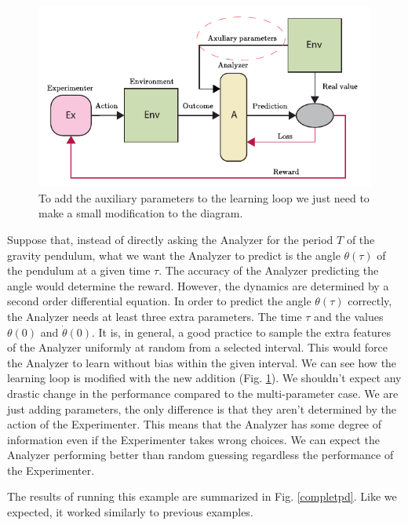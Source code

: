 \documentclass[11pt,a4paper,twoside]{report}
\newcommand{\+}{\textnormal{+} }
\theoremstyle{definition}
\numberwithin{equation}{chapter}
\begin{document}
  \begin{figure}
    \centering
    \includegraphics{figures/Auxiliary Parameters.pdf}
    \caption{To add the auxiliary parameters to the learning loop we just need
    to make a small modification to the diagram.}
    \label{fig:auxiliaryparameter}
  \end{figure}

  Suppose that, instead of directly asking the Analyzer for the period $T$ of
  the gravity pendulum, what we want the Analyzer to predict is the angle
  $\theta(\tau)$ of the pendulum at a given time $\tau$. The accuracy of the
  Analyzer predicting the angle would determine the reward. However, the
  dynamics are determined by a second order differential equation. In order to
  predict the angle $\theta(\tau)$ correctly, the Analyzer needs at least three
  extra parameters. The time $\tau$ and the values $\theta(0)$ and
  $\dot{\theta}(0)$. It is, in general, a good practice to sample the extra
  features of the Analyzer uniformly at random from a selected interval. This
  would force the Analyzer to learn without bias within the given interval. We
  can see how the learning loop is modified with the new addition (Fig.
  \ref{fig:auxiliaryparameter}). We shouldn't expect any drastic change in the
  performance compared to the multi-parameter case. We are just adding
  parameters, the only difference is that they aren't determined by the
  action of the Experimenter. This means that the Analyzer has some
  degree of information even if the Experimenter takes wrong choices. We can
  expect the Analyzer performing better than random guessing regardless the
  performance of the Experimenter.
  
  \par The results of running this example are summarized in 
  Fig. \ref{completpd}. Like we expected, it worked similarly to previous 
  examples.
\end{document}
